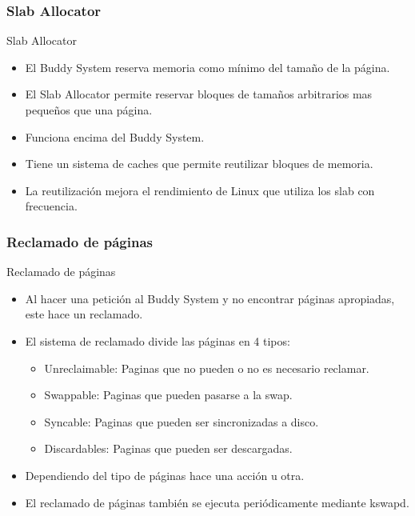 \subsubsection{Slab Allocator}
\begin{frame}{Slab Allocator}
	\begin{itemize}
		\item El Buddy System reserva memoria como mínimo del tamaño de la página.
		\item El Slab Allocator permite reservar bloques de tamaños arbitrarios mas pequeños que una página.
		\item Funciona encima del Buddy System.
		\item Tiene un sistema de caches que permite reutilizar bloques de memoria.
		\item La reutilización mejora el rendimiento de Linux que utiliza los slab con frecuencia.
	\end{itemize}
\end{frame}

\subsubsection{Reclamado de páginas}
\begin{frame}{Reclamado de páginas}
	\begin{itemize}
		\item Al hacer una petición al Buddy System y no encontrar páginas apropiadas, este hace un reclamado.
		\item El sistema de reclamado divide las páginas en 4 tipos:
		\begin{itemize}
			\item Unreclaimable: Paginas que no pueden o no es necesario reclamar.
			\item Swappable: Paginas que pueden pasarse a la swap.
			\item Syncable: Paginas que pueden ser sincronizadas a disco.
			\item Discardables: Paginas que pueden ser descargadas.
		\end{itemize}
		\item Dependiendo del tipo de páginas hace una acción u otra.
		\item El reclamado de páginas también se ejecuta periódicamente mediante kswapd.
	\end{itemize}
\end{frame}
